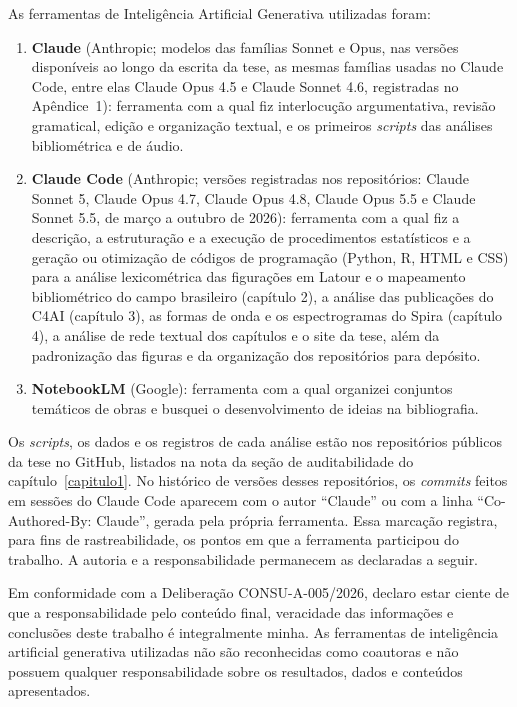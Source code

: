 As ferramentas de Inteligência Artificial Generativa utilizadas foram:

\begin{enumerate}
  \item \textbf{Claude} (Anthropic; modelos das famílias Sonnet e Opus, nas versões disponíveis ao longo da escrita da tese, as mesmas famílias usadas no Claude Code, entre elas Claude Opus 4.5 e Claude Sonnet 4.6, registradas no Apêndice~1): ferramenta com a qual fiz interlocução argumentativa, revisão gramatical, edição e organização textual, e os primeiros \emph{scripts} das análises bibliométrica e de áudio.
  \item \textbf{Claude Code} (Anthropic; versões registradas nos repositórios: Claude Sonnet 5, Claude Opus 4.7, Claude Opus 4.8, Claude Opus 5.5 e Claude Sonnet 5.5, de março a outubro de 2026): ferramenta com a qual fiz a descrição, a estruturação e a execução de procedimentos estatísticos e a geração ou otimização de códigos de programação (Python, R, HTML e CSS) para a análise lexicométrica das figurações em Latour e o mapeamento bibliométrico do campo brasileiro (capítulo 2), a análise das publicações do C4AI (capítulo 3), as formas de onda e os espectrogramas do Spira (capítulo 4), a análise de rede textual dos capítulos e o site da tese, além da padronização das figuras e da organização dos repositórios para depósito.
  \item \textbf{NotebookLM} (Google): ferramenta com a qual organizei conjuntos temáticos de obras e busquei o desenvolvimento de ideias na bibliografia.
\end{enumerate}

Os \emph{scripts}, os dados e os registros de cada análise estão nos repositórios públicos da tese no GitHub, listados na nota da seção de auditabilidade do capítulo~\ref{capitulo1}. No histórico de versões desses repositórios, os \emph{commits} feitos em sessões do Claude Code aparecem com o autor \enquote{Claude} ou com a linha \enquote{Co-Authored-By: Claude}, gerada pela própria ferramenta. Essa marcação registra, para fins de rastreabilidade, os pontos em que a ferramenta participou do trabalho. A autoria e a responsabilidade permanecem as declaradas a seguir.

Em conformidade com a Deliberação CONSU-A-005/2026, declaro estar ciente de que a responsabilidade pelo conteúdo final, veracidade das informações e conclusões deste trabalho é integralmente minha. As ferramentas de inteligência artificial generativa utilizadas não são reconhecidas como coautoras e não possuem qualquer responsabilidade sobre os resultados, dados e conteúdos apresentados.

